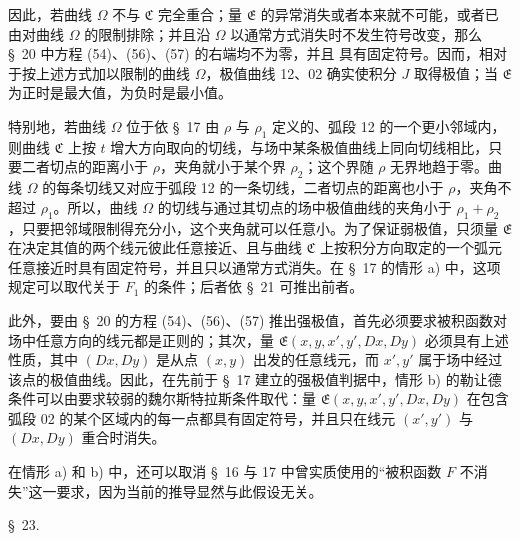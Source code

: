 \documentclass[11pt,a4paper,leqno]{article}
\begin{document}
因此，若曲线 $\Omega$ 不与 $\mathfrak{C}$ 完全重合；量 $\mathfrak{E}$ 的异常消失或者本来就不可能，或者已由对曲线 $\Omega$ 的限制排除；并且沿 $\Omega$ 以通常方式消失时不发生符号改变，那么 \S~20 中方程 (54)、(56)、(57) 的右端均不为零，并且
具有固定符号。因而，相对于按上述方式加以限制的曲线 $\Omega$，极值曲线 12、02 确实使积分 $J$ 取得极值；当 $\mathfrak{E}$ 为正时是最大值，为负时是最小值。

特别地，若曲线 $\Omega$ 位于依 \S~17 由 $\rho$ 与 $\rho_1$ 定义的、弧段 12 的一个更小邻域内，则曲线 $\mathfrak{C}$ 上按 $t$ 增大方向取向的切线，与场中某条极值曲线上同向切线相比，只要二者切点的距离小于 $\rho$，夹角就小于某个界 $\rho_2$；这个界随 $\rho$ 无界地趋于零。曲线 $\Omega$ 的每条切线又对应于弧段 12 的一条切线，二者切点的距离也小于 $\rho$，夹角不超过 $\rho_1$。所以，曲线 $\Omega$ 的切线与通过其切点的场中极值曲线的夹角小于 $\rho_1+\rho_2$，只要把邻域限制得充分小，这个夹角就可以任意小。为了保证弱极值，只须量 $\mathfrak{E}$ 在决定其值的两个线元彼此任意接近、且与曲线 $\mathfrak{C}$ 上按积分方向取定的一个弧元任意接近时具有固定符号，并且只以通常方式消失。在 \S~17 的情形 a) 中，这项规定可以取代关于 $F_1$ 的条件；后者依 \S~21 可推出前者。

此外，要由 \S~20 的方程 (54)、(56)、(57) 推出强极值，首先必须要求被积函数对场中任意方向的线元都是正则的；其次，量 $\mathfrak{E}(x,y,x',y',D x,D y)$ 必须具有上述性质，其中 $(D x,D y)$ 是从点 $(x,y)$ 出发的任意线元，而 $x',y'$ 属于场中经过该点的极值曲线。因此，在先前于 \S~17 建立的强极值判据中，情形 b) 的勒让德条件可以由要求较弱的魏尔斯特拉斯条件取代：量 $\mathfrak{E}(x,y,x',y',D x,D y)$ 在包含弧段 02 的某个区域内的每一点都具有固定符号，并且只在线元 $(x',y')$ 与 $(D x,D y)$ 重合时消失。

在情形 a) 和 b) 中，还可以取消 \S~16 与 17
中曾实质使用的“被积函数 $F$ 不消失”这一要求，因为当前的推导显然与此假设无关。

\begin{center}{\large \S~23.}\end{center}
\end{document}
